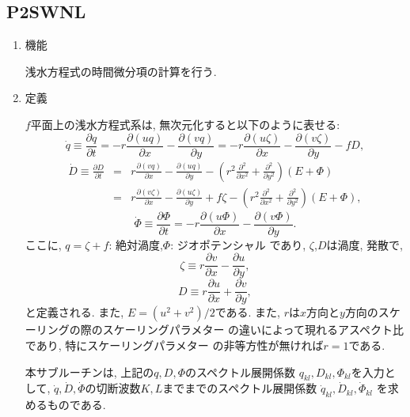 \documentclass[a4j,fleqn]{jarticle}
\begin{document}

\subsection{P2SWNL}

\begin{enumerate}

\item 機能 

浅水方程式の時間微分項の計算を行う.

\item 定義

$f$平面上の浅水方程式系は, 無次元化すると以下のように表せる:
\begin{equation}
\dot{q}\equiv\frac{\partial q}{\partial t}
=-r\frac{\partial(uq)}{\partial x}
-\frac{\partial(vq)}{\partial y}
=-r\frac{\partial(u\zeta)}{\partial x}
 -\frac{\partial(v\zeta)}{\partial y}-fD,
\end{equation} 
\begin{eqnarray}
\dot{D}\equiv\frac{\partial D}{\partial t}
&=&r\frac{\partial(vq)}{\partial x}
-\frac{\partial(uq)}{\partial y}
-\left(r^2\frac{\partial^2}{\partial x^2}
  +\frac{\partial^2}{\partial y^2}\right)(E+\Phi)\\
&=&r\frac{\partial(v\zeta)}{\partial x}
-\frac{\partial(u\zeta)}{\partial y}+f\zeta
-\left(r^2\frac{\partial^2}{\partial x^2}
  +\frac{\partial^2}{\partial y^2}\right)(E+\Phi),
\end{eqnarray}  
\begin{equation}
\dot{\Phi}\equiv\frac{\partial \Phi}{\partial t}
=-r\frac{\partial(u\Phi)}{\partial x}
-\frac{\partial(v\Phi)}{\partial y}.
\end{equation}
ここに, $q=\zeta+f$: 絶対渦度,$\Phi$: ジオポテンシャル
であり, $\zeta$,$D$は渦度, 発散で,
\begin{equation}
\zeta\equiv
r\frac{\partial v}{\partial x}
-\frac{\partial u}{\partial y},
\end{equation}
\begin{equation}
D\equiv
r\frac{\partial u}{\partial x}
+\frac{\partial v}{\partial y},
\end{equation}
と定義される. また, $E=(u^2+v^2)/2$である.
また, $r$は$x$方向と$y$方向のスケーリングの際のスケーリングパラメター
の違いによって現れるアスペクト比であり, 特にスケーリングパラメター
の非等方性が無ければ$r=1$である.

本サブルーチンは, 上記の$q,D,\Phi$のスペクトル展開係数
$q_{kl},D_{kl},\Phi_{kl}$を入力として,
$\dot{q},\dot{D},\dot{\Phi}$の切断波数$K,L$までまでのスペクトル展開係数
$\dot{q}_{kl},\dot{D}_{kl},\dot{\Phi}_{kl}$
を求めるものである.


\end{enumerate}
\end{document}
